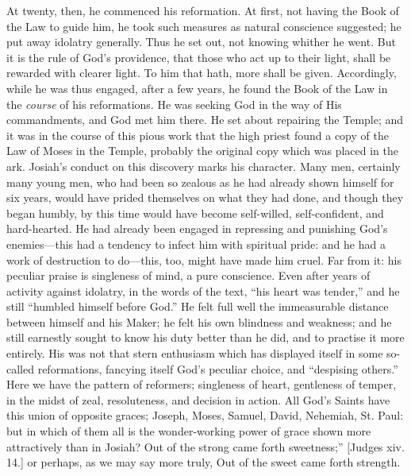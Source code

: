 At twenty, then, he commenced his reformation. At first, not having
the Book of the Law to guide him, he took such measures as natural
conscience suggested; he put away idolatry generally. Thus he set out,
not knowing whither he went. But it is the rule of God's providence,
that those who act up to their light, shall be rewarded with clearer
light. To him that hath, more shall be given. Accordingly, while he
was thus engaged, after a few years, he found the Book of the Law in
the \emph{course} of his reformations. He was seeking God in the way
of His commandments, and God met him there. He set about repairing the
Temple; and it was in the course of this pious work that the high
priest found a copy of the Law of Moses in the Temple, probably the
original copy which was placed in the ark. Josiah's conduct on this
discovery marks his character. Many men, certainly many young men, who
had been so zealous as he had already shown himself for six years,
would have prided themselves on what they had done, and though they
began humbly, by this time would have become self-willed,
self-confident, and hard-hearted. He had already been engaged in
repressing and punishing God's enemies—this had a tendency to infect
him with spiritual pride: and he had a work of destruction to do—this,
too, might have made him cruel. Far from it: his peculiar praise is
singleness of mind, a pure conscience. Even after years of activity
against idolatry, in the words of the text, ``his heart was
tender,'' and he still ``humbled himself before God.'' He
felt full well the immeasurable distance between himself and his
Maker; he felt his own blindness and weakness; and he still earnestly
sought to know his duty better than he did, and to practise it more
entirely. His was not that stern enthusiasm which has displayed itself
in some so-called reformations, fancying itself God's peculiar choice,
and ``despising others.'' Here we have the pattern of
reformers; singleness of heart, gentleness of temper, in the midst of
zeal, resoluteness, and decision in action. All God's Saints have this
union of opposite graces; Joseph, Moses, Samuel, David, Nehemiah, St.
Paul: but in which of them all is the wonder-working power of grace
shown more attractively than in Josiah? Out of the strong came forth
sweetness;'' [Judges xiv. 14.] or perhaps, as we may say more
truly, Out of the sweet came forth strength.

